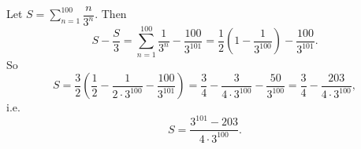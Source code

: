 Let $S=\sum_{n=1}^{100}\dfrac {n}{3^n}$. Then
\[
S-\dfrac {S}{3}=\sum_{n=1}^{100}\dfrac{1}{3^n}-\dfrac{100}{3^{101}}=\dfrac{1}{2}\left(1-\dfrac{1}{3^{100}}\right)-\dfrac{100}{3^{101}} .
\]
So
\[
S=\dfrac{3}{2}\left(\dfrac{1}{2}-\dfrac{1}{2\cdot3^{100}}-\dfrac{100}{3^{101}}\right)=\dfrac{3}{4}-\dfrac{3}{4\cdot3^{100}}-\dfrac{50}{3^{100}}=\dfrac{3}{4}-\dfrac{203}{4\cdot3^{100}} ,
\]
i.e.
\[
S=\boxed{\dfrac{3^{101}-203}{4\cdot3^{100}}}.
\]
